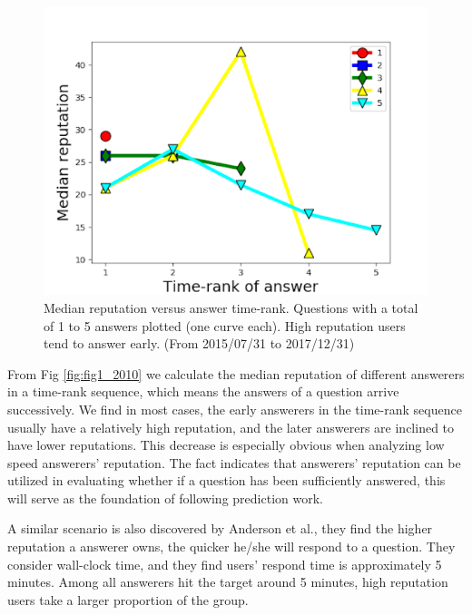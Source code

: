 \begin{figure}[!t]
    \centering
    \includegraphics[width=0.7\columnwidth]{img/Fig1_2017.pdf}
    \caption{Median reputation versus answer time-rank. Questions with a total of 1 to 5 answers plotted (one curve each). High reputation users tend to answer early. (From 2015/07/31 to 2017/12/31)}
    \label{fig:fig1_2017}
\end{figure}

From Fig \ref{fig:fig1_2010} we calculate the median reputation of different answerers in a time-rank sequence, which means the answers of a question arrive successively. We find in most cases, the early answerers in the time-rank sequence usually have a relatively high reputation, and the later answerers are inclined to have lower reputations. This decrease is especially obvious when analyzing low speed answerers' reputation. The fact indicates that answerers' reputation can be utilized in evaluating whether if a question has been sufficiently answered, this will serve as the foundation of following prediction work. %

A similar scenario is also discovered by Anderson et al.\cite{anderson2012discovering}, they find the higher reputation a answerer owns, the quicker he/she will respond to a question. They consider wall-clock time, and they find users' respond time is approximately 5 minutes. Among all answerers hit the target around 5 minutes, high reputation users take a larger proportion of the group. 


